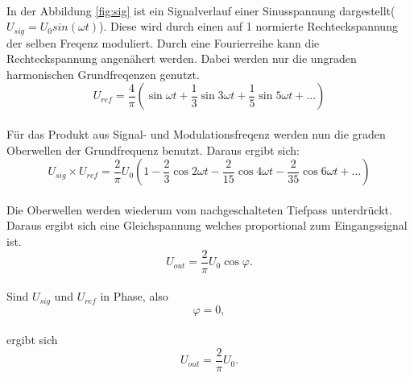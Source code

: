 \\In der Abbildung \ref{fig:sig} ist ein Signalverlauf einer Sinusspannung dargestellt($U_{sig} = U_0sin(\omega t)$).
Diese wird durch einen auf 1 normierte Rechteckspannung der selben Freqenz moduliert.
Durch eine Fourierreihe kann die Rechteckspannung angenähert werden.
Dabei werden nur die ungraden harmonischen Grundfreqenzen \omega genutzt.
\begin{equation}
  U_{ref} =  \frac{4}{\pi}  \left( \sin{\omega t}+\frac{1}{3}\sin{3\omega t}+\frac{1}{5}\sin{5\omega t}+...\right)
\end{equation}
\label{eqn:uref}
\\Für das Produkt aus Signal- und Modulationsfreqenz werden nun die graden Oberwellen der Grundfrequenz \omega benutzt. Daraus ergibt sich:
\begin{equation}
  U_{sig} \times U_{ref} =  \frac{2}{\pi}U_0  \left(1- \frac{2}{3}\cos{2\omega t}-\frac{2}{15}\cos{4\omega t}-\frac{2}{35}\cos{6\omega t}+...\right)
\end{equation}
\label{eqn:usig*uref}
\\Die Oberwellen werden wiederum vom nachgeschalteten Tiefpass unterdrückt. Daraus ergibt sich eine Gleichspannung welches proportional zum Eingangssignal ist.
\begin{equation}
  U_{out} =  \frac{2}{\pi}U_0 \cos{\varphi}.
\end{equation}
\label{eqn:uoutcos}
\\Sind $U_{sig}$ und $U_{ref}$ in Phase, also
\begin{equation*}
  \varphi = 0,
\end{equation*}
\\ergibt sich
\begin{equation}
  U_{out} =  \frac{2}{\pi}U_0.
\end{equation}
\label{eqn:uout}
\FloatBarrier
